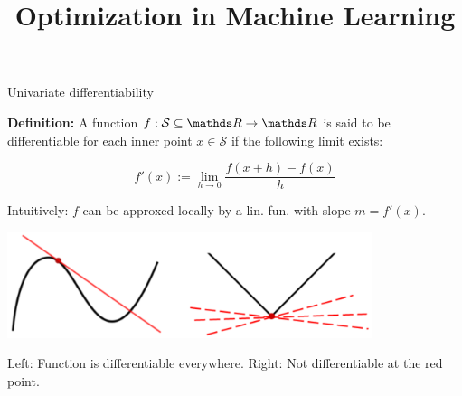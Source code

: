 \documentclass[11pt,compress,t,notes=noshow, xcolor=table]{beamer}
\title{Optimization in Machine Learning}
\date{}
\begin{document}
\sloppy



\begin{vbframe}{Univariate differentiability}

\textbf{Definition:} A function $f: \mathcal{S} \subseteq \R \to \R$ is said to be differentiable for each inner point $x \in \mathcal{S}$ if the following limit exists:

$$
f'(x) := \lim_{h \to 0} \frac{f(x + h) - f(x)}{h}
$$

Intuitively: $f$ can be approxed locally by a lin. fun. with slope $m = f'(x)$. 

\begin{center}
\includegraphics[width = 0.8\textwidth]{figure_man/tangent.png} \\
\begin{footnotesize}
Left: Function is differentiable everywhere. Right: Not differentiable at the red point. 
\end{footnotesize}
\end{center}








\end{vbframe}
\end{document}
